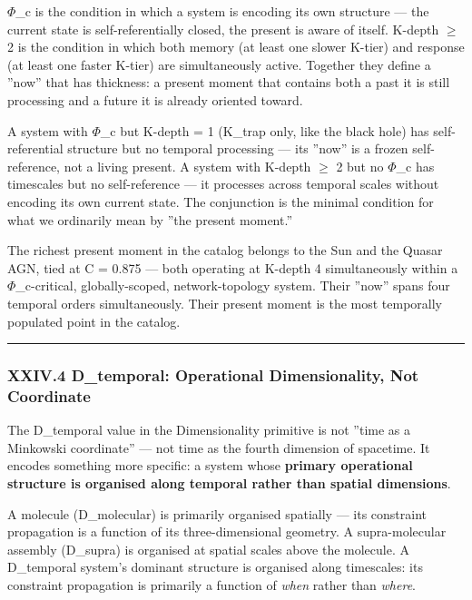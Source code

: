 \documentclass[12pt,a4paper]{article}
\begin{document}
$\Phi$\_c is the condition in which a system is encoding its own structure --- the current state is self-referentially closed, the present is aware of itself. K-depth $\geq$ 2 is the condition in which both memory (at least one slower K-tier) and response (at least one faster K-tier) are simultaneously active. Together they define a ''now'' that has thickness: a present moment that contains both a past it is still processing and a future it is already oriented toward.

A system with $\Phi$\_c but K-depth = 1 (K\_trap only, like the black hole) has self-referential structure but no temporal processing --- its ''now'' is a frozen self-reference, not a living present. A system with K-depth $\geq$ 2 but no $\Phi$\_c has timescales but no self-reference --- it processes across temporal scales without encoding its own current state. The conjunction is the minimal condition for what we ordinarily mean by ''the present moment.''

The richest present moment in the catalog belongs to the Sun and the Quasar AGN, tied at C = 0.875 --- both operating at K-depth 4 simultaneously within a $\Phi$\_c-critical, globally-scoped, network-topology system. Their ''now'' spans four temporal orders simultaneously. Their present moment is the most temporally populated point in the catalog.

\begin{center}
\rule{0.5\textwidth}{0.4pt}
\end{center}

\subsubsection{XXIV.4 D\_temporal: Operational Dimensionality, Not Coordinate}

The D\_temporal value in the Dimensionality primitive is not ''time as a Minkowski coordinate'' --- not time as the fourth dimension of spacetime. It encodes something more specific: a system whose \textbf{primary operational structure is organised along temporal rather than spatial dimensions}.

A molecule (D\_molecular) is primarily organised spatially --- its constraint propagation is a function of its three-dimensional geometry. A supra-molecular assembly (D\_supra) is organised at spatial scales above the molecule. A D\_temporal system's dominant structure is organised along timescales: its constraint propagation is primarily a function of \emph{when} rather than \emph{where}.
\end{document}
